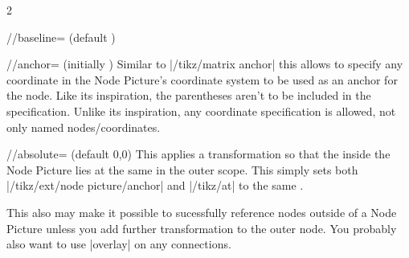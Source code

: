 \begin{multicols*}{2}
\begin{key}{/\tikzextnp/baseline= (default )}
\begin{codeexample}[preamble=\usetikzlibrary{ext.nodes}]
\end{codeexample}
\end{key}
\begin{key}{/\tikzextnp/anchor= (initially )}
  Similar to |/tikz/matrix anchor| this allows to specify any coordinate in the Node Picture's coordinate system
  to be used as an anchor for the node.
  Like its inspiration, the parentheses aren't to be included in the  specification.
  Unlike its inspiration, any coordinate specification is allowed, not only named nodes/coordinates.
\begin{codeexample}[preamble=\usetikzlibrary{ext.nodes}]
\end{codeexample}
\end{key}
\begin{key}{/\tikzextnp/absolute= (default 0,0)}
  This applies a transformation so that the  inside the Node Picture
  lies at the same  in the outer scope.
  This simply sets both |/tikz/ext/node picture/anchor| and |/tikz/at| to the same .
  
  This also may make it possible to sucessfully reference nodes outside of a Node Picture
  unless you add further transformation to the outer node.
  You probably also want to use |overlay| on any connections.
\begin{codeexample}[preamble=\usetikzlibrary{ext.nodes},width=3.5cm]
\end{codeexample}
\end{key}


\end{multicols*}
